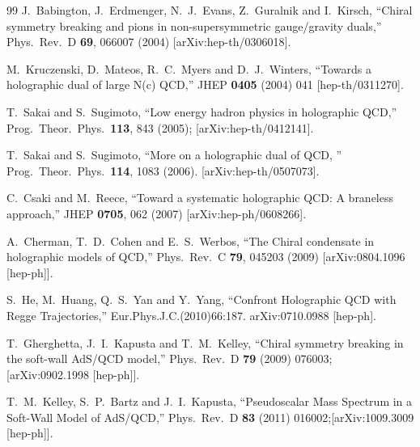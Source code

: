 \documentclass[11pt,a4paper,psfrag]{article}
\begin{document}
\begin{thebibliography}{99}
 J.~Babington, J.~Erdmenger, N.~J.~Evans, Z.~Guralnik and I.~Kirsch,
``Chiral symmetry breaking and pions in non-supersymmetric gauge/gravity duals,''
Phys.\ Rev.\ D \textbf{69}, 066007 (2004)  [arXiv:hep-th/0306018].

  M.~Kruczenski, D.~Mateos, R.~C.~Myers and D.~J.~Winters,
  ``Towards a holographic dual of large N(c) QCD,''
  JHEP {\bf 0405} (2004) 041
  [hep-th/0311270].

 T.~Sakai and S.~Sugimoto,
``Low energy hadron physics in holographic QCD,''
Prog.\ Theor.\ Phys.\ \textbf{113}, 843 (2005);  [arXiv:hep-th/0412141].

 T.~Sakai and S.~Sugimoto,
``More on a holographic dual of QCD,
'' Prog.\ Theor.\ Phys.\ \textbf{114}, 1083 (2006).  [arXiv:hep-th/0507073].

  C.~Csaki and M.~Reece,
 ``Toward a systematic holographic QCD: A braneless approach,''
  JHEP {\bf 0705}, 062 (2007)
  [arXiv:hep-ph/0608266].

  A.~Cherman, T.~D.~Cohen and E.~S.~Werbos,
  ``The Chiral condensate in holographic models of QCD,''
  Phys.\ Rev.\ C {\bf 79}, 045203 (2009)
  [arXiv:0804.1096 [hep-ph]].

 S.~He, M.~Huang, Q.~S.~Yan and Y.~Yang,
 ``Confront Holographic QCD with Regge Trajectories,''
  Eur.Phys.J.C.(2010)66:187.
  arXiv:0710.0988 [hep-ph].

T.~Gherghetta, J.~I.~Kapusta and T.~M.~Kelley,
``Chiral symmetry breaking in the soft-wall AdS/QCD model,''
Phys.\ Rev.\ D {\bf 79} (2009) 076003; [arXiv:0902.1998 [hep-ph]].

  T.~M.~Kelley, S.~P.~Bartz and J.~I.~Kapusta,
 ``Pseudoscalar Mass Spectrum in a Soft-Wall Model of AdS/QCD,''
  Phys.\ Rev.\ D {\bf 83} (2011) 016002;[arXiv:1009.3009 [hep-ph]].


\end{thebibliography}
\end{document}
